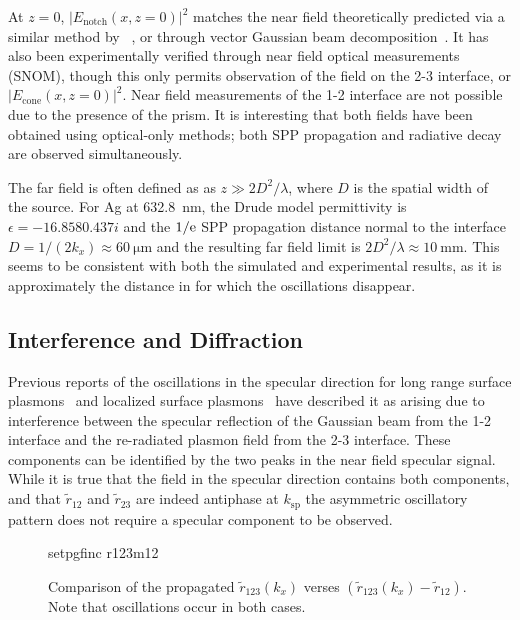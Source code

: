 At $z=0$, $|E_\text{notch}(x,z=0)|^2$ matches the near field theoretically
predicted via a similar method by ~\cite{chuang1986lateral}, or through
vector Gaussian beam decomposition~\cite{baida1999theoretical}.  It has
also been experimentally verified through near field optical measurements
(SNOM), though this only permits observation of the field on the 2-3
interface, or $|E_\text{cone}(x,z=0)|^2$.  Near field measurements of the
1-2 interface are not possible due to the presence of the prism.  It is
interesting that both fields have been obtained using optical-only methods;
both SPP propagation and radiative decay are observed simultaneously.

The far field is often defined as as $z\gg 2 D^2/\lambda$, where $D$ is the
spatial width of the source.  For Ag at \SI{632.8}{\nano\meter}, the Drude
model permittivity is $\epsilon = \num{-16.858+0.437i}$ and the $1/{\mathrm{e}}$ SPP
propagation distance normal to the interface $D = 1/(2 k_x) \approx
\SI{60}{\micro\meter}$ and the resulting far field limit is $2 D^2/\lambda
\approx \SI{10}{\milli\meter}$.  This seems to be consistent with both the
simulated and experimental results, as it is approximately the distance in
 for which the oscillations disappear.

\subsection{Interference and Diffraction}
Previous reports of the oscillations in the specular direction for long
range surface plasmons~\cite{simon2007observation} and localized surface
plasmons~\cite{schumann2008near} have described it as arising due to
interference between the specular reflection of the Gaussian beam from the
1-2 interface and the re-radiated plasmon field from the 2-3 interface.
These components can be identified by the two peaks in the near field
specular signal.  While it is true that the field in the
specular direction contains both components, and that $\tilde{r}_{12}$ and
$\tilde{r}_{23}$ are indeed antiphase at $k_\text{sp}$ the asymmetric 
oscillatory pattern does not require a specular component to be observed.
\begin{figure}[ht]
 \centering
 {setpgfinc}
 {r123m12}
\caption{Comparison of the propagated $\tilde{r}_{123}(k_x)$ verses
$(\tilde{r}_{123}(k_x)-\tilde{r}_{12})$.  Note that oscillations occur in
both cases.  }
 \label{fig:r123m12}
\end{figure}

